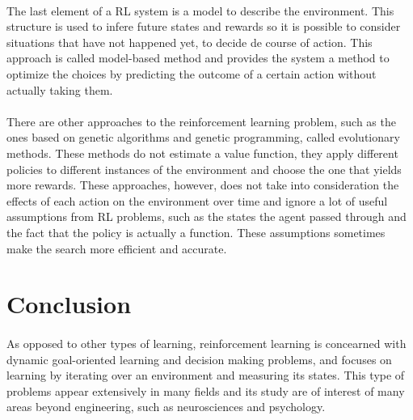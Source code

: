 \documentclass{article}
\begin{document}
\paragraph{}
The last element of a RL system is a model to describe the environment. This structure is used to infere future states and rewards so it is possible to consider situations that have not happened yet, to decide de course of action. This approach is called model-based method and provides the system a method to optimize the choices by predicting the outcome of a certain action without actually taking them. 
\paragraph{}
There are other approaches to the reinforcement learning problem, such as the ones based on genetic algorithms and genetic programming, called evolutionary methods. These methods do not estimate a value function, they apply different policies to different instances of the environment and choose the one that yields more rewards. These approaches, however, does not take into consideration the effects of each action on the environment over time and ignore a lot of useful assumptions from RL problems, such as the states the agent passed through and the fact that the policy is actually a function. These assumptions sometimes make the search more efficient and accurate.

\section{Conclusion}
\paragraph{}
As opposed to other types of learning, reinforcement learning is concearned with dynamic goal-oriented learning and decision making problems, and focuses on learning by iterating over an environment and measuring its states. This type of problems appear extensively in many fields and its study are of interest of many areas beyond engineering, such as neurosciences and psychology.
\end{document}
